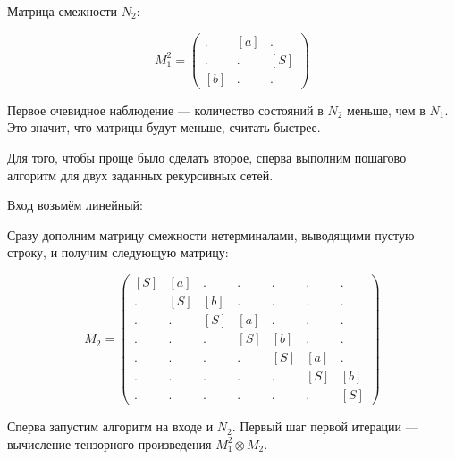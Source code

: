 \begin{example}
Матрица смежности $N_2$:

$$
M_1^2 =
\begin{pmatrix}
.   & [a] & .    \\
.   & .   & [S]  \\
[b] & .   & . 
\end{pmatrix}
$$


Первое очевидное наблюдение --- количество состояний в $N_2$ меньше, чем в $N_1$.
Это значит, что матрицы будут меньше, считать быстрее.

Для того, чтобы проще было сделать второе, сперва выполним пошагово алгоритм для двух заданных рекурсивных сетей.

Вход возьмём линейный:
\begin{center}
\end{center}


Сразу дополним матрицу смежности нетерминалами, выводящими пустую строку, и получим следующую матрицу:

$$
M_2 =
\begin{pmatrix}
[S] & [a] & .   & .   & .   & .   & .   \\
.   & [S] & [b] & .   & .   & .   & .   \\
.   & .   & [S] & [a] & .   & .   & .   \\
.   & .   & .   & [S] & [b] & .   & .   \\
.   & .   & .   & .   & [S] & [a] & .   \\
.   & .   & .   & .   & .   & [S] & [b] \\
.   & .   & .   & .   & .   & .   & [S] 
\end{pmatrix}
$$

Сперва запустим алгоритм на входе и $N_2$. 
Первый шаг первой итерации --- вычисление тензорного произведения $M_1^2 \otimes M_2$.


\end{example}

